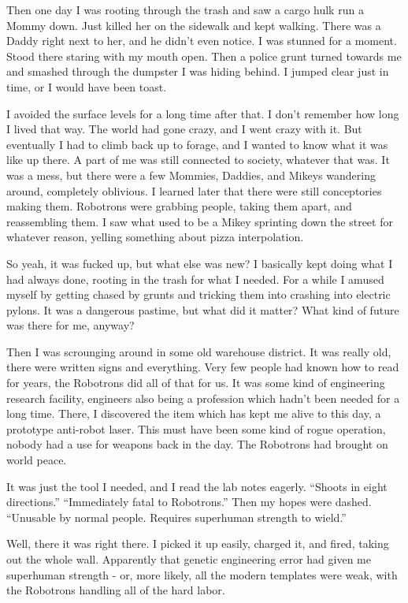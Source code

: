 \documentclass{amsbook}
\begin{document}
Then one day I was rooting through the trash and saw a cargo hulk run a Mommy down.  Just killed her on the sidewalk and kept walking.  There was a Daddy right next to her, and he didn't even notice.  I was stunned for a moment.  Stood there staring with my mouth open.  Then a police grunt turned towards me and smashed through the dumpster I was hiding behind.  I jumped clear just in time, or I would have been toast.

I avoided the surface levels for a long time after that.  I don't remember how long I lived that way.  The world had gone crazy, and I went crazy with it.  But eventually I had to climb back up to forage, and I wanted to know what it was like up there.  A part of me was still connected to society, whatever that was.  It was a mess, but there were a few Mommies, Daddies, and Mikeys wandering around, completely oblivious.  I learned later that there were still conceptories making them.  Robotrons were grabbing people, taking them apart, and reassembling them.  I saw what used to be a Mikey sprinting down the street for whatever reason, yelling something about pizza interpolation.

So yeah, it was fucked up, but what else was new?  I basically kept doing what I had always done, rooting in the trash for what I needed.  For a while I amused myself by getting chased by grunts and tricking them into crashing into electric pylons.  It was a dangerous pastime, but what did it matter?  What kind of future was there for me, anyway?

Then I was scrounging around in some old warehouse district.  It was really old, there were written signs and everything.  Very few people had known how to read for years, the Robotrons did all of that for us.  It was some kind of engineering research facility, engineers also being a profession which hadn't been needed for a long time.  There, I discovered the item which has kept me alive to this day, a prototype anti-robot laser.  This must have been some kind of rogue operation, nobody had a use for weapons back in the day.  The Robotrons had brought on world peace.

It was just the tool I needed, and I read the lab notes eagerly. ``Shoots in eight directions.'' ``Immediately fatal to Robotrons.''  Then my hopes were dashed.  ``Unusable by normal people.  Requires superhuman strength to wield.''

Well, there it was right there.  I picked it up easily, charged it, and fired, taking out the whole wall.  Apparently that genetic engineering error had given me superhuman strength - or, more likely, all the modern templates were weak, with the Robotrons handling all of the hard labor.
\end{document}
